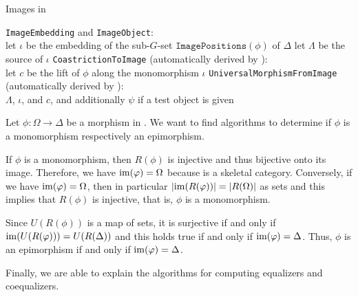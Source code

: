 \begin{algorithm}\capstart
    \caption{Images in \SkeletalGSets{}}\label{algo:ImageEmbedding}\label{algo:Images}
	\BlankLine
	\texttt{ImageEmbedding} and \texttt{ImageObject}:\\
	let $\iota$ be the embedding of the sub-$G$-set $\texttt{ImagePositions}(\phi)$ of $\Delta$\;
	let $\Lambda$ be the source of $\iota$\;
	\BlankLine
	\texttt{CoastrictionToImage} (automatically derived by \CapPkg{}):\\
	let $c$ be the lift of $\phi$ along the monomorphism $\iota$\;
	\BlankLine
	\texttt{UniversalMorphismFromImage} (automatically derived by \CapPkg{}):\\
	\BlankLine
	\Return $\Lambda$, $\iota$, and $c$, and additionally $\psi$ if a test object is given\;
\end{algorithm}

\begin{rem}\label{rem:IsMonoIsEpi}
Let $\phi\colon \Omega \to \Delta$ be a morphism in \SkeletalGSets{}. We want to find algorithms to determine if $\phi$ is a monomorphism respectively an epimorphism.

If $\phi$ is a monomorphism, then $R(\phi)$ is injective and thus bijective onto its image. Therefore, we have $\operatorname{im}(\varphi) = \Omega$ because \SkeletalGSets{} is a skeletal category. Conversely, if we have $\operatorname{im}(\varphi) = \Omega$, then in particular ${\lvert\operatorname{im}(R(\varphi))\rvert} = {\lvert R(\Omega)\rvert}$ as sets and this implies that $R(\phi)$ is injective, that is, $\phi$ is a monomorphism.

Since $U(R(\phi))$ is a map of sets, it is surjective if and only if $\operatorname{im}(U(R(\varphi))) = U(R(\Delta))$ and this holds true if and only if $\operatorname{im}(\varphi) = \Delta$. Thus, $\phi$ is an epimorphism if and only if $\operatorname{im}(\varphi) = \Delta$.
\end{rem}

Finally, we are able to explain the algorithms for computing equalizers and coequalizers.


